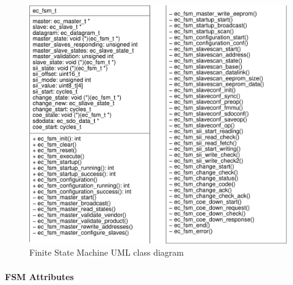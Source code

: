 \documentclass[a4paper,12pt,BCOR6mm,bibtotoc,idxtotoc]{scrbook}
\begin{document}
\begin{figure}[htbp]
  \centering
  \includegraphics[width=.9\textwidth]{images/uml-fsm}
  \caption{Finite State Machine UML class diagram}
  \label{fig:uml-fsm}
\end{figure}

\paragraph{FSM Attributes}
\end{document}
